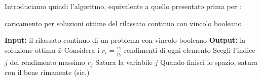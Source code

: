 \documentclass[a4paper,11pt]{article}
\begin{document}
Introduciamo quindi l'algoritmo, equivalente a quello presentato prima per :
\begin{algorithm}[H]
\caption{caricamento per soluzioni ottime del rilassato continuo con vincolo booleano}
\begin{algorithmic}
	\STATE \textbf{Input:} il rilassato continuo di un problema con vincolo booleano
	\STATE \textbf{Output:} la soluzione ottima $\bar{x}$
	\STATE Considera i $r_i = \frac{v_i}{p_i}$ rendimenti di ogni elemento
	\STATE Scegli l'indice $j$ del rendimento massimo $r_j$
	\STATE Satura la variabile $j$
	\STATE Quando finisci lo spazio, satura con il bene rimanente (sic.)
\end{algorithmic}
\end{algorithm}
\end{document}
